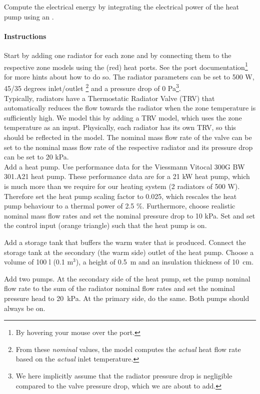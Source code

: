 \documentclass[10pt,a4paper]{article}
\begin{document}
Compute the electrical energy by integrating the electrical power of the heat pump
using an .

\paragraph{Instructions}
Start by adding one radiator for each zone and by 
connecting them to the respective zone models using the (red) heat ports.
See the port documentation\footnote{By hovering your mouse over the port.} 
for more hints about how to do so.
The radiator parameters can be set to 500 W, 45/35 degrees inlet/outlet \footnote{From these \textit{nominal} values, the model computes the \textit{actual} heat flow rate based on the \textit{actual} inlet temperature.}
and a pressure drop of 0 Pa\footnote{We here implicitly assume that the radiator pressure drop is negligible compared to the valve pressure drop, which we are about to add.}.\\

Typically, radiators have a Thermostatic Radiator Valve (TRV)
that automatically reduces the flow towards the radiator
when the zone temperature is sufficiently high.
We model this by adding a TRV model, which uses
the zone temperature  as an input.
Physically, each radiator has its own TRV, 
so this should be reflected in the model.
The nominal mass flow rate of the valve can be set to the nominal
mass flow rate of the respective radiator and its pressure drop can be set 
to 20 kPa.\\

Add a heat pump. 
Use performance data for the Viessmann Vitocal 300G BW 301.A21 heat pump.
These performance data are for a 21 kW heat pump, 
which is much more than we require for our heating system (2 radiators of 500 W).
Therefore set the heat pump scaling factor to 0.025, 
which rescales the heat pump behaviour to a thermal power of 2.5 \%.
Furthermore, choose realistic nominal mass flow rates and set the nominal pressure
drop to 10 kPa. Set  and set the control input (orange triangle)
such that the heat pump is on.

Add a storage tank that buffers the warm water that is produced.
Connect the storage tank at the secondary (the warm side) outlet of the heat pump.
Choose a volume of 100 l (0.1 m$^3$), a height of 0.5~m and an insulation thickness of 10~cm.

Add two pumps.
At the secondary side of the heat pump, 
set the pump nominal flow rate to the sum of the radiator nominal flow rates
and set the nominal pressure head to 20~kPa.
At the primary side, do the same.
Both pumps should always be on.
\end{document}
